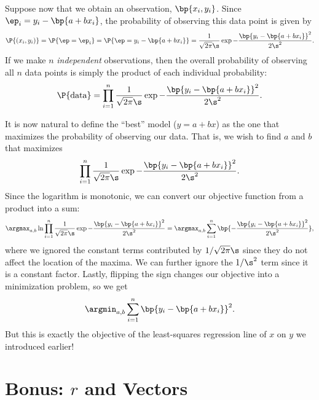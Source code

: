Suppose now that we obtain an observation, $\bp{x_i, y_i}$. Since $\ep_i = y_i - \bp{a + bx_i}$, the probability of observing this data point is given by \[\P{(x_i, y_i)} = \P{\ep = \ep_i} = \P{\ep = y_i - \bp{a + bx_i}} = \frac1{\sqrt{2\pi} \s} \exp{-\frac{\bp{y_i - \bp{a + bx_i}}^2}{2\s^2}}.\] If we make $n$ \emph{independent} observations, then the overall probability of observing all $n$ data points is simply the product of each individual probability: \[\P{\text{data}} = \prod_{i = 1}^n \frac1{\sqrt{2\pi} \s} \exp{-\frac{\bp{y_i - \bp{a + bx_i}}^2}{2\s^2}}.\]

It is now natural to define the ``best'' model ($y = a + bx$) as the one that maximizes the probability of observing our data. That is, we wish to find $a$ and $b$ that maximizes \[\prod_{i = 1}^n \frac1{\sqrt{2\pi} \s} \exp{-\frac{\bp{y_i - \bp{a + bx_i}}^2}{2\s^2}}.\] Since the logarithm is monotonic, we can convert our objective function from a product into a sum: \[\argmax_{a, b} \ln \prod_{i = 1}^n \frac1{\sqrt{2\pi} \s} \exp{-\frac{\bp{y_i - \bp{a + bx_i}}^2}{2\s^2}} = \argmax_{a, b} \sum_{i = 1}^n \bp{-\frac{\bp{y_i - \bp{a + bx_i}}^2}{2\s^2}},\] where we ignored the constant terms contributed by $1/\sqrt{2\pi} \s$ since they do not affect the location of the maxima. We can further ignore the $1/\s^2$ term since it is a constant factor. Lastly, flipping the sign changes our objective into a minimization problem, so we get \[\argmin_{a, b} \sum_{i = 1}^n \bp{y_i - \bp{a + b x_i}}^2.\] But this is exactly the objective of the least-squares regression line of $x$ on $y$ we introduced earlier!

\section{Bonus: $r$ and Vectors}


